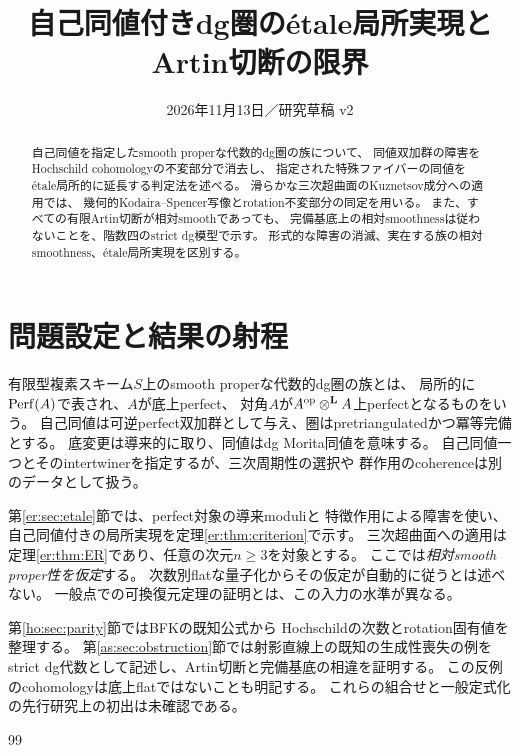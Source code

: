
\title{自己同値付きdg圏のétale局所実現とArtin切断の限界}
\author{}
\date{2026年11月13日／研究草稿 v2}

\maketitle
\begin{abstract}
自己同値を指定したsmooth properな代数的dg圏の族について、
同値双加群の障害をHochschild cohomologyの不変部分で消去し、
指定された特殊ファイバーの同値をétale局所的に延長する判定法を述べる。
滑らかな三次超曲面のKuznetsov成分への適用では、
幾何的Kodaira--Spencer写像とrotation不変部分の同定を用いる。
また、すべての有限Artin切断が相対smoothであっても、
完備基底上の相対smoothnessは従わないことを、階数四のstrict dg模型で示す。
形式的な障害の消滅、実在する族の相対smoothness、étale局所実現を区別する。
\end{abstract}

\section*{問題設定と結果の射程}
有限型複素スキーム$S$上のsmooth properな代数的dg圏の族とは、
局所的に$\operatorname{Perf}(A)$で表され、$A$が底上perfect、
対角$A$が$A^{\mathrm{op}}\mathbin{\otimes^{\mathbf L}} A$上perfectとなるものをいう。
自己同値は可逆perfect双加群として与え、圏はpretriangulatedかつ冪等完備とする。
底変更は導来的に取り、同値はdg Morita同値を意味する。
自己同値一つとそのintertwinerを指定するが、三次周期性の選択や
群作用のcoherenceは別のデータとして扱う。

第\ref{er:sec:etale}節では、perfect対象の導来moduli\cite{TV}と
特徴作用による障害\cite{ERLowen}を使い、
自己同値付きの局所実現を定理\ref{er:thm:criterion}で示す。
三次超曲面への適用は定理\ref{er:thm:ER}であり、任意の次元$n\ge3$を対象とする。
ここでは\emph{相対smooth proper性を仮定}する。
次数別flatな量子化からその仮定が自動的に従うとは述べない。
一般点での可換復元定理の証明とは、この入力の水準が異なる。

第\ref{ho:sec:parity}節ではBFKの既知公式\cite{BFKER}から
Hochschildの次数とrotation固有値を整理する。
第\ref{as:sec:obstruction}節では射影直線上の既知の生成性喪失の例\cite{AMSasha}を
strict dg代数として記述し、Artin切断と完備基底の相違を証明する。
この反例のcohomologyは底上flatではないことも明記する。
これらの組合せと一般定式化の先行研究上の初出は未確認である。




\begin{thebibliography}{99}

\end{thebibliography}

